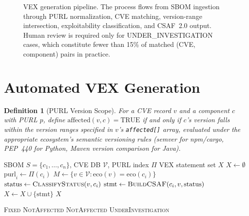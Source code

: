 \documentclass[11pt,twocolumn]{article}
\newtheorem{definition}{Definition}
\begin{document}
\FloatBarrier
\begin{figure}[t]
  \centering
  
  \caption{VEX generation pipeline. The process flows from SBOM ingestion
  through PURL normalization, CVE matching, version-range intersection,
  exploitability classification, and CSAF~2.0 output. Human review is required
  only for UNDER\_INVESTIGATION cases, which constitute fewer than 15\% of
  matched (CVE, component) pairs in practice.}
  \label{fig:vexpipeline}
\end{figure}

\section{Automated VEX Generation}

\begin{definition}[PURL Version Scope]
For a CVE record $v$ and a component $c$ with PURL $p$, define
$\mathrm{affected}(v, c) = \mathrm{TRUE}$ if and only if $c$'s version falls
within the version ranges specified in $v$'s \texttt{affected[]} array, evaluated
under the appropriate ecosystem's semantic versioning rules (semver for npm/cargo,
PEP~440 for Python, Maven version comparison for Java).
\end{definition}

\begin{algorithm}[H]
\caption{Automated VEX Statement Generation}
\begin{algorithmic}[1]
\Require SBOM $S = \{c_1,\ldots,c_n\}$, CVE DB $\mathcal{V}$, PURL index $\Pi$
\Ensure VEX statement set $X$
\State $X \gets \emptyset$
  \State $\mathrm{purl}_i \gets \Pi(c_i)$
  \State $M \gets \{v \in \mathcal{V} : \mathrm{eco}(v) = \mathrm{eco}(c_i)\}$
      \State $\mathrm{status} \gets \Call{ClassifyStatus}{v, c_i}$
      \State $\mathrm{stmt} \gets \Call{BuildCSAF}{c_i, v, \mathrm{status}}$
      \State $X \gets X \cup \{\mathrm{stmt}\}$
    \EndIf
  \EndFor
\EndFor
\State \Return $X$
\end{algorithmic}
\end{algorithm}

\begin{algorithm}[H]
\caption{$\textsc{ClassifyStatus}(v, c_i)$ --- subroutine of Alg.~2}
\begin{algorithmic}[1]
  \Return \textsc{Fixed}
\EndIf
{}
  \Return \textsc{NotAffected}
\EndIf
{}
  \Return \textsc{NotAffected}
\EndIf
\State \Return \textsc{UnderInvestigation} 
\end{algorithmic}
\end{algorithm}
\end{document}
